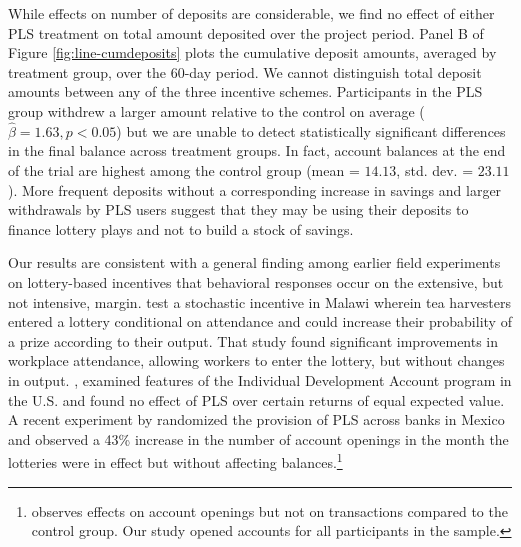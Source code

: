 \documentclass[11pt]{article}
\begin{document}
		\clearpage

		While effects on number of deposits are considerable, we find no effect of either PLS treatment on total amount deposited over the project period. Panel B of Figure \ref{fig:line-cumdeposits} plots the cumulative deposit amounts, averaged by treatment group, over the 60-day period. We cannot distinguish total deposit amounts between any of the three incentive schemes. Participants in the PLS group withdrew a larger amount relative to the control on average ($\hat \beta = 1.63, p < 0.05$) but we are unable to detect statistically significant differences in the final balance across treatment groups. In fact, account balances at the end of the trial are highest among the control group (mean = $14.13$, std. dev. = $23.11$). More frequent deposits without a corresponding increase in savings and larger withdrawals by PLS users suggest that they may be using their deposits to finance lottery plays and not to build a stock of savings.

		Our results are consistent with a general finding among earlier field experiments on lottery-based incentives that behavioral responses occur on the extensive, but not intensive, margin. \textcite{brune_effect_2015} test a stochastic incentive in Malawi wherein tea harvesters entered a lottery conditional on attendance and could increase their probability of a prize according to their output. That study found significant improvements in workplace attendance, allowing workers to enter the lottery, but without changes in output. \textcite{loibl_testing_2016}, examined features of the Individual Development Account program in the U.S. and found no effect of PLS over certain returns of equal expected value. A recent experiment by \textcite{gertler_long-term_2017} randomized the provision of PLS across banks in Mexico and observed a 43\% increase in the number of account openings in the month the lotteries were in effect but without affecting balances.\footnote{\textcite{gertler_long-term_2017} observes effects on account openings but not on transactions compared to the control group. Our study opened accounts for all participants in the sample.}
\end{document}
